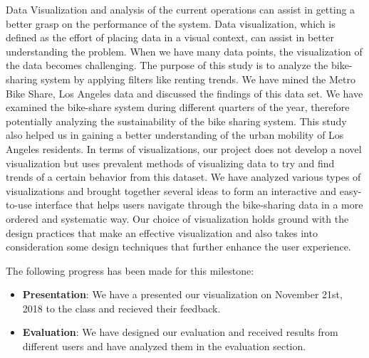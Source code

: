 Data Visualization and analysis of the current operations can assist in getting a better grasp on the performance of the system. Data visualization, which is defined as the effort of placing data in a visual context, can assist in better understanding the problem. When we have many data points, the visualization of the data becomes challenging. The purpose of this study is to analyze the bike-sharing system by applying filters like renting trends. We have mined the Metro Bike Share, Los Angeles data and discussed the findings of this data set. We have examined the bike-share system during different quarters of the year, therefore potentially analyzing the sustainability of the bike sharing system. This study also helped us in gaining a better understanding of the urban mobility of Los Angeles residents. In terms of visualizations, our project does not develop a novel visualization but uses prevalent methods of visualizing data to try and find trends of a certain behavior from this dataset. We have analyzed various types of visualizations and brought together several ideas to form an interactive and easy-to-use interface that helps users navigate through the bike-sharing data in a more ordered and systematic way. Our choice of visualization holds ground with the design practices that make an effective visualization and also takes into consideration some design techniques that further enhance the user experience.

The following progress has been made for this milestone:
\begin{itemize}
  \item \textbf{Presentation}: We have a presented our visualization on November 21st, 2018 to the class and recieved their feedback.  
  \item \textbf{Evaluation}: We have designed our evaluation and received results from different users and have analyzed them in the evaluation section.

\end{itemize}
